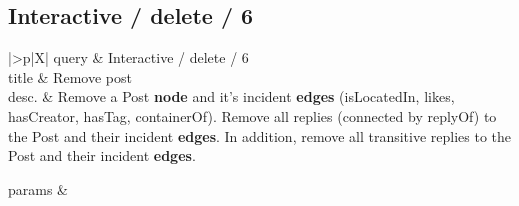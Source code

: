\renewcommand*{\arraystretch}{1.1}

\subsection{Interactive / delete / 6}
\label{sec:interactive-delete-06}

\let\oldemph\emph
\renewcommand{\emph}[1]{{\footnotesize \sf #1}}

\renewcommand{\currentQueryCard}{6}


\noindent\begin{tabularx}{\queryCardWidth}{|>{\queryPropertyCell}p{\queryPropertyCellWidth}|X|}
	\hline
	query & Interactive / delete / 6 \\ \hline
%
	title & Remove post \\ \hline
%
%
	desc. & Remove a \emph{Post} \textbf{node} and it's incident \textbf{edges} (\emph{isLocatedIn}, \emph{likes}, \emph{hasCreator}, \emph{hasTag}, \emph{containerOf}). Remove all replies (connected by \emph{replyOf}) to the \emph{Post} and their incident \textbf{edges}. In addition, remove all transitive replies to the \emph{Post} and their incident \textbf{edges}.
 \\ \hline
%
	
		params &
		\innerCardVSpace \\ \hline
	
%
	
%
\end{tabularx}
\queryCardVSpace

\let\emph\oldemph